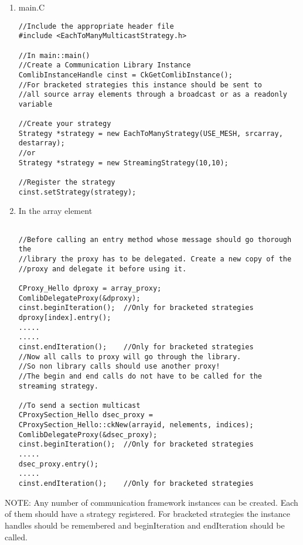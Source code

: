 \begin{enumerate}
\item main.C 
\begin{verbatim}
//Include the appropriate header file
#include <EachToManyMulticastStrategy.h>

//In main::main() 
//Create a Communication Library Instance
ComlibInstanceHandle cinst = CkGetComlibInstance();
//For bracketed strategies this instance should be sent to 
//all source array elements through a broadcast or as a readonly variable

//Create your strategy
Strategy *strategy = new EachToManyStrategy(USE_MESH, srcarray, destarray);
//or
Strategy *strategy = new StreamingStrategy(10,10);

//Register the strategy
cinst.setStrategy(strategy);

\end{verbatim}

\item In the array element 
\begin{verbatim}

//Before calling an entry method whose message should go thorough the
//library the proxy has to be delegated. Create a new copy of the
//proxy and delegate it before using it.

CProxy_Hello dproxy = array_proxy;
ComlibDelegateProxy(&dproxy);
cinst.beginIteration();  //Only for bracketed strategies
dproxy[index].entry();   
.....
.....
cinst.endIteration();    //Only for bracketed strategies
//Now all calls to proxy will go through the library.
//So non library calls should use another proxy!
//The begin and end calls do not have to be called for the streaming strategy.

//To send a section multicast
CProxySection_Hello dsec_proxy = CProxySection_Hello::ckNew(arrayid, nelements, indices);
ComlibDelegateProxy(&dsec_proxy);
cinst.beginIteration();  //Only for bracketed strategies
.....
dsec_proxy.entry();
.....
cinst.endIteration();    //Only for bracketed strategies

\end{verbatim}
\end{enumerate}

NOTE: Any number of communication framework instances can be
created. Each of them should have a strategy registered. For bracketed
strategies the instance handles should be remembered and
beginIteration and endIteration should be called.
